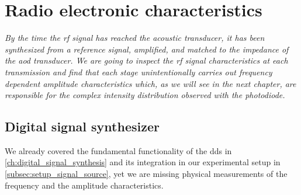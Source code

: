 \chapter{Radio electronic characteristics}

\textit{By the time the \gls{rf} signal has reached the acoustic transducer,
it has been synthesized from a reference signal, amplified, and matched to
the impedance of the \gls{aod} transducer. We are going to inspect the
\gls{rf} signal characteristics at each transmission and find that each stage
unintentionally carries out frequency dependent amplitude characteristics
which, as we will see in the next chapter, are responsible for the complex
intensity distribution observed with the photodiode.}

\section{Digital signal synthesizer}

We already covered the fundamental functionality of the \gls{dds} in
\cref{ch:digital_signal_synthesis} and its integration in our experimental
setup in \cref{subsec:setup_signal_source}, yet we are missing physical
measurements of the frequency and the amplitude characteristics.

